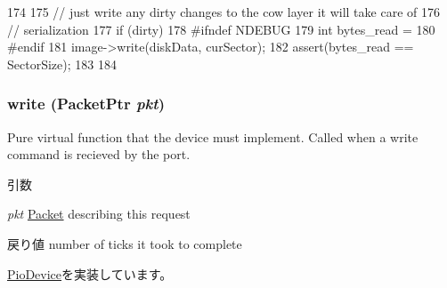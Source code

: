 \begin{DoxyCode}
174 {
175     // just write any dirty changes to the cow layer it will take care of
176     // serialization
177     if (dirty) {
178 #ifndef NDEBUG
179         int bytes_read =
180 #endif
181             image->write(diskData, curSector);
182         assert(bytes_read == SectorSize);
183     }
184 }
\end{DoxyCode}
\hypertarget{classMmDisk_a4cefab464e72b5dd42c003a0a4341802}{
\subsubsection[{write}]{ write ({\bf PacketPtr} {\em pkt})}}
\label{classMmDisk_a4cefab464e72b5dd42c003a0a4341802}
Pure virtual function that the device must implement. Called when a write command is recieved by the port. 
\begin{DoxyParams}{引数}
\item[{\em pkt}]\hyperlink{classPacket}{Packet} describing this request \end{DoxyParams}
\begin{DoxyReturn}{戻り値}
number of ticks it took to complete 
\end{DoxyReturn}


\hyperlink{classPioDevice_afe8371668d023bb2516b286e5e399b6f}{PioDevice}を実装しています。


